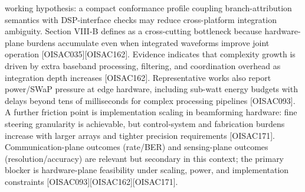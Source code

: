 \markdownRendererUlItem working hypothesis: a compact conformance profile coupling branch-attribution semantics with DSP-interface checks may reduce cross-platform integration ambiguity.\markdownRendererUlItemEnd 
\markdownRendererUlEndTight \markdownRendererInterblockSeparator
{}
\markdownRendererSectionEnd 
\markdownRendererSectionEnd \markdownRendererSectionBegin
{}\markdownRendererInterblockSeparator
{}\markdownRendererSectionBegin
{}\markdownRendererInterblockSeparator
{}Section VIII-B defines  as a cross-cutting bottleneck because hardware-plane burdens accumulate even when integrated waveforms improve joint operation [O\markdownRendererUnderscore{}ISAC\markdownRendererUnderscore{}035][O\markdownRendererUnderscore{}ISAC\markdownRendererUnderscore{}162]. Evidence indicates that complexity growth is driven by extra baseband processing, filtering, and coordination overhead as integration depth increases [O\markdownRendererUnderscore{}ISAC\markdownRendererUnderscore{}162]. Representative works also report power/SWaP pressure at edge hardware, including sub-watt energy budgets with delays beyond tens of milliseconds for complex processing pipelines [O\markdownRendererUnderscore{}ISAC\markdownRendererUnderscore{}093]. A further friction point is implementation scaling in beamforming hardware: fine steering granularity is achievable, but control-system and fabrication burdens increase with larger arrays and tighter precision requirements [O\markdownRendererUnderscore{}ISAC\markdownRendererUnderscore{}171]. Communication-plane outcomes (rate/BER) and sensing-plane outcomes (resolution/accuracy) are relevant but secondary in this context; the primary blocker is hardware-plane feasibility under scaling, power, and implementation constraints [O\markdownRendererUnderscore{}ISAC\markdownRendererUnderscore{}093][O\markdownRendererUnderscore{}ISAC\markdownRendererUnderscore{}162][O\markdownRendererUnderscore{}ISAC\markdownRendererUnderscore{}171].\markdownRendererInterblockSeparator
